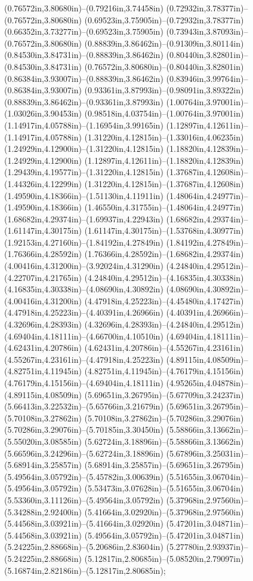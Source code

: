 (0.76572in,3.80680in)--(0.79216in,3.74458in) (0.72932in,3.78377in)--(0.76572in,3.80680in) (0.69523in,3.75905in)--(0.72932in,3.78377in) (0.66352in,3.73277in)--(0.69523in,3.75905in) (0.73943in,3.87093in)--(0.76572in,3.80680in) (0.88839in,3.86462in)--(0.91309in,3.80114in) (0.84530in,3.84731in)--(0.88839in,3.86462in) (0.80440in,3.82801in)--(0.84530in,3.84731in) (0.76572in,3.80680in)--(0.80440in,3.82801in) (0.86384in,3.93007in)--(0.88839in,3.86462in) (0.83946in,3.99764in)--(0.86384in,3.93007in) (0.93361in,3.87993in)--(0.98091in,3.89322in) (0.88839in,3.86462in)--(0.93361in,3.87993in) (1.00764in,3.97001in)--(1.03026in,3.90453in) (0.98518in,4.03754in)--(1.00764in,3.97001in) (1.14917in,4.05788in)--(1.16954in,3.99165in) (1.12897in,4.12611in)--(1.14917in,4.05788in) (1.31220in,4.12815in)--(1.33016in,4.06235in) (1.24929in,4.12900in)--(1.31220in,4.12815in) (1.18820in,4.12839in)--(1.24929in,4.12900in) (1.12897in,4.12611in)--(1.18820in,4.12839in) (1.29439in,4.19577in)--(1.31220in,4.12815in) (1.37687in,4.12608in)--(1.44326in,4.12299in) (1.31220in,4.12815in)--(1.37687in,4.12608in) (1.49590in,4.18366in)--(1.51130in,4.11911in) (1.48064in,4.24977in)--(1.49590in,4.18366in) (1.46550in,4.31755in)--(1.48064in,4.24977in) (1.68682in,4.29374in)--(1.69937in,4.22943in) (1.68682in,4.29374in)--(1.61147in,4.30175in) (1.61147in,4.30175in)--(1.53768in,4.30977in) (1.92153in,4.27160in)--(1.84192in,4.27849in) (1.84192in,4.27849in)--(1.76366in,4.28592in) (1.76366in,4.28592in)--(1.68682in,4.29374in) (4.00416in,4.31200in)--(3.92024in,4.31290in) (4.24840in,4.29512in)--(4.22707in,4.21765in) (4.24840in,4.29512in)--(4.16835in,4.30338in) (4.16835in,4.30338in)--(4.08690in,4.30892in) (4.08690in,4.30892in)--(4.00416in,4.31200in) (4.47918in,4.25223in)--(4.45480in,4.17427in) (4.47918in,4.25223in)--(4.40391in,4.26966in) (4.40391in,4.26966in)--(4.32696in,4.28393in) (4.32696in,4.28393in)--(4.24840in,4.29512in) (4.69404in,4.18111in)--(4.66700in,4.10510in) (4.69404in,4.18111in)--(4.62431in,4.20786in) (4.62431in,4.20786in)--(4.55267in,4.23161in) (4.55267in,4.23161in)--(4.47918in,4.25223in) (4.89115in,4.08509in)--(4.82751in,4.11945in) (4.82751in,4.11945in)--(4.76179in,4.15156in) (4.76179in,4.15156in)--(4.69404in,4.18111in) (4.95265in,4.04878in)--(4.89115in,4.08509in) (5.69651in,3.26795in)--(5.67709in,3.24237in) (5.66413in,3.22532in)--(5.65766in,3.21679in) (5.69651in,3.26795in)--(5.70108in,3.27862in) (5.70108in,3.27862in)--(5.70286in,3.29076in) (5.70286in,3.29076in)--(5.70185in,3.30450in) (5.58866in,3.13662in)--(5.55020in,3.08585in) (5.62724in,3.18896in)--(5.58866in,3.13662in) (5.66596in,3.24296in)--(5.62724in,3.18896in) (5.67896in,3.25031in)--(5.68914in,3.25857in) (5.68914in,3.25857in)--(5.69651in,3.26795in) (5.49564in,3.05792in)--(5.45782in,3.00639in) (5.51655in,3.06704in)--(5.49564in,3.05792in) (5.53473in,3.07628in)--(5.51655in,3.06704in) (5.53360in,3.11126in)--(5.49564in,3.05792in) (5.37968in,2.97560in)--(5.34288in,2.92400in) (5.41664in,3.02920in)--(5.37968in,2.97560in) (5.44568in,3.03921in)--(5.41664in,3.02920in) (5.47201in,3.04871in)--(5.44568in,3.03921in) (5.49564in,3.05792in)--(5.47201in,3.04871in) (5.24225in,2.88668in)--(5.20686in,2.83604in) (5.27780in,2.93937in)--(5.24225in,2.88668in) (5.12817in,2.80685in)--(5.08520in,2.79097in) (5.16874in,2.82186in)--(5.12817in,2.80685in);
